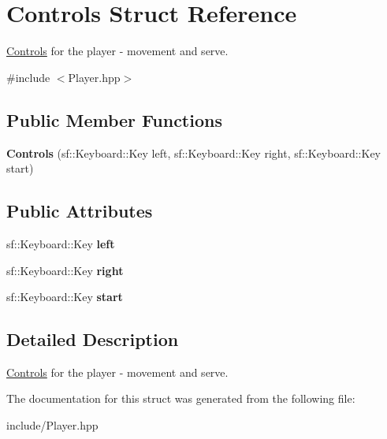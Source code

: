 \hypertarget{struct_controls}{}\section{Controls Struct Reference}
\label{struct_controls}


\mbox{\hyperlink{struct_controls}{Controls}} for the player -\/ movement and serve.  




{\ttfamily \#include $<$Player.\+hpp$>$}

\subsection*{Public Member Functions}
\begin{DoxyCompactItemize}
\item 
\mbox{\label{struct_controls_a7c95ee06840828f979b7eb0bf4b23bf9}} 
{\bfseries Controls} (sf\+::\+Keyboard\+::\+Key left, sf\+::\+Keyboard\+::\+Key right, sf\+::\+Keyboard\+::\+Key start)
\end{DoxyCompactItemize}
\subsection*{Public Attributes}
\begin{DoxyCompactItemize}
\item 
\mbox{\label{struct_controls_a67ae975a4254a72c796681a7c8c850da}} 
sf\+::\+Keyboard\+::\+Key {\bfseries left}
\item 
\mbox{\label{struct_controls_ac0b4b73fa43e078cc66a4e531cdc9623}} 
sf\+::\+Keyboard\+::\+Key {\bfseries right}
\item 
\mbox{\label{struct_controls_a83bddc1c685070d19f0b509f3bf301f0}} 
sf\+::\+Keyboard\+::\+Key {\bfseries start}
\end{DoxyCompactItemize}


\subsection{Detailed Description}
\mbox{\hyperlink{struct_controls}{Controls}} for the player -\/ movement and serve. 

The documentation for this struct was generated from the following file\+:\begin{DoxyCompactItemize}
\item 
include/Player.\+hpp\end{DoxyCompactItemize}
